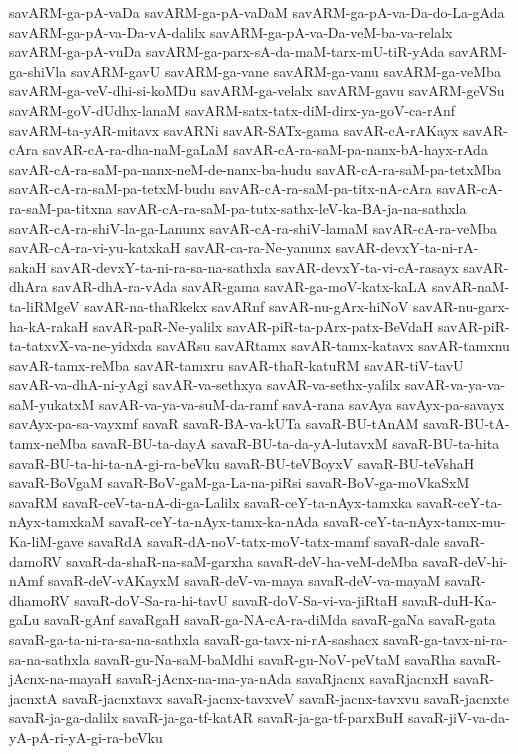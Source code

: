 {savARM-ga-pA-vaDa
savARM-ga-pA-vaDaM
savARM-ga-pA-va-Da-do-La-gAda
savARM-ga-pA-va-Da-vA-dalilx
savARM-ga-pA-va-Da-veM-ba-va-relalx
savARM-ga-pA-vuDa
savARM-ga-parx-sA-da-maM-tarx-mU-tiR-yAda
savARM-ga-shiVla
savARM-gavU
savARM-ga-vane
savARM-ga-vanu
savARM-ga-veMba
savARM-ga-veV-dhi-si-koMDu
savARM-ga-velalx
savARM-gavu
savARM-geVSu
savARM-goV-dUdhx-lanaM
savARM-satx-tatx-diM-dirx-ya-goV-ca-rAnf
savARM-ta-yAR-mitavx
savARNi
savAR-SATx-gama
savAR-cA-rAKayx
savAR-cAra
savAR-cA-ra-dha-naM-gaLaM
savAR-cA-ra-saM-pa-nanx-bA-hayx-rAda
savAR-cA-ra-saM-pa-nanx-neM-de-nanx-ba-hudu
savAR-cA-ra-saM-pa-tetxMba
savAR-cA-ra-saM-pa-tetxM-budu
savAR-cA-ra-saM-pa-titx-nA-cAra
savAR-cA-ra-saM-pa-titxna
savAR-cA-ra-saM-pa-tutx-sathx-leV-ka-BA-ja-na-sathxla
savAR-cA-ra-shiV-la-ga-Lanunx
savAR-cA-ra-shiV-lamaM
savAR-cA-ra-veMba
savAR-cA-ra-vi-yu-katxkaH
savAR-ca-ra-Ne-yanunx
savAR-devxY-ta-ni-rA-sakaH
savAR-devxY-ta-ni-ra-sa-na-sathxla
savAR-devxY-ta-vi-cA-rasayx
savAR-dhAra
savAR-dhA-ra-vAda
savAR-gama
savAR-ga-moV-katx-kaLA
savAR-naM-ta-liRMgeV
savAR-na-thaRkekx
savARnf
savAR-nu-gArx-hiNoV
savAR-nu-garx-ha-kA-rakaH
savAR-paR-Ne-yalilx
savAR-piR-ta-pArx-patx-BeVdaH
savAR-piR-ta-tatxvX-va-ne-yidxda
savARsu
savARtamx
savAR-tamx-katavx
savAR-tamxnu
savAR-tamx-reMba
savAR-tamxru
savAR-thaR-katuRM
savAR-tiV-tavU
savAR-va-dhA-ni-yAgi
savAR-va-sethxya
savAR-va-sethx-yalilx
savAR-va-ya-va-saM-yukatxM
savAR-va-ya-va-suM-da-ramf
savA-rana
savAya
savAyx-pa-savayx
savAyx-pa-sa-vayxmf
savaR
savaR-BA-va-kUTa
savaR-BU-tAnAM
savaR-BU-tA-tamx-neMba
savaR-BU-ta-dayA
savaR-BU-ta-da-yA-lutavxM
savaR-BU-ta-hita
savaR-BU-ta-hi-ta-nA-gi-ra-beVku
savaR-BU-teVBoyxV
savaR-BU-teVshaH
savaR-BoVgaM
savaR-BoV-gaM-ga-La-na-piRsi
savaR-BoV-ga-moVkaSxM
savaRM
savaR-ceV-ta-nA-di-ga-Lalilx
savaR-ceY-ta-nAyx-tamxka
savaR-ceY-ta-nAyx-tamxkaM
savaR-ceY-ta-nAyx-tamx-ka-nAda
savaR-ceY-ta-nAyx-tamx-mu-Ka-liM-gave
savaRdA
savaR-dA-noV-tatx-moV-tatx-mamf
savaR-dale
savaR-damoRV
savaR-da-shaR-na-saM-garxha
savaR-deV-ha-veM-deMba
savaR-deV-hi-nAmf
savaR-deV-vAKayxM
savaR-deV-va-maya
savaR-deV-va-mayaM
savaR-dhamoRV
savaR-doV-Sa-ra-hi-tavU
savaR-doV-Sa-vi-va-jiRtaH
savaR-duH-Ka-gaLu
savaR-gAnf
savaRgaH
savaR-ga-NA-cA-ra-diMda
savaR-gaNa
savaR-gata
savaR-ga-ta-ni-ra-sa-na-sathxla
savaR-ga-tavx-ni-rA-sashacx
savaR-ga-tavx-ni-ra-sa-na-sathxla
savaR-gu-Na-saM-baMdhi
savaR-gu-NoV-peVtaM
savaRha
savaR-jAcnx-na-mayaH
savaR-jAcnx-na-ma-ya-nAda
savaRjacnx
savaRjacnxH
savaR-jacnxtA
savaR-jacnxtavx
savaR-jacnx-tavxveV
savaR-jacnx-tavxvu
savaR-jacnxte
savaR-ja-ga-dalilx
savaR-ja-ga-tf-katAR
savaR-ja-ga-tf-parxBuH
savaR-jiV-va-da-yA-pA-ri-yA-gi-ra-beVku
}
